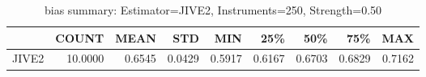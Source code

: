 \begin{table}[ht]
\centering
\caption{bias summary: Estimator=JIVE2, Instruments=250, Strength=0.50}
\begin{tabular}{lrrrrrrrr}
\toprule
 & COUNT & MEAN & STD & MIN & 25\% & 50\% & 75\% & MAX \\
\midrule
JIVE2 & 10.0000 & 0.6545 & 0.0429 & 0.5917 & 0.6167 & 0.6703 & 0.6829 & 0.7162 \\
\bottomrule
\end{tabular}
\end{table}
